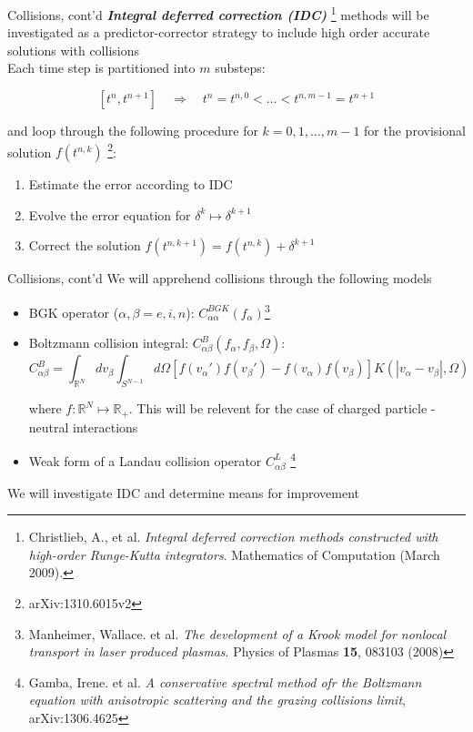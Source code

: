 \documentclass{beamer}
\begin{document}
\begin{frame}{Collisions, cont'd}
\textbf{\emph{Integral deferred correction (IDC)}} \footnote{Christlieb, A., et al. \emph{Integral deferred correction methods constructed with high-order Runge-Kutta integrators}. Mathematics of Computation (March 2009).} methods will be investigated as a predictor-corrector strategy to include high order accurate solutions with collisions\\[0.5em]

Each time step is partitioned into $m$ substeps:

$$[t^n,t^{n+1}] \quad \Rightarrow \quad t^{n} = t^{n,0} < \ldots < t^{n,m-1}= t^{n+1}$$

and loop through the following procedure for $k = 0, 1, \ldots , m-1$ for the provisional solution $f(t^{n,k})$ \footnote{arXiv:1310.6015v2}:

\begin{enumerate}
    \item Estimate the error according to IDC
    \item Evolve the error equation for $\delta^k \mapsto \delta^{k+1}$ 
    \item Correct the solution $f(t^{n,k+1}) = f(t^{n,k}) + \delta^{k+1}$ 
\end{enumerate}

\end{frame}


\begin{frame}{Collisions, cont'd}
We will apprehend collisions through the following models
\begin{itemize}
    \item BGK operator ($\alpha,\beta = e,i,n$): $C_{\alpha\alpha}^{BGK} (f_{\alpha})$\footnote{Manheimer, Wallace. et al. \emph{The development of a Krook model for nonlocal transport in laser produced plasmas}. Physics of Plasmas \textbf{15}, 083103 (2008)}
    \item Boltzmann collision integral: $C_{\alpha\beta}^B(f_{\alpha},f_{\beta},\Omega )$:
$$C_{\alpha\beta}^B = \int_{\mathbb{R}^N} dv_{\beta}\int_{S^{N-1}}d\Omega [f(v_{\alpha}')f(v_{\beta}') - f(v_{\alpha})f(v_{\beta})]K(|v_{\alpha} - v_{\beta}|, \Omega )$$

where $f : \mathbb{R}^N \mapsto \mathbb{R}_+$. This will be relevent for the case of charged particle - neutral interactions
     \item Weak form of a Landau collision operator $C_{\alpha\beta}^L$ \footnote{Gamba, Irene. et al. \emph{A conservative spectral method ofr the Boltzmann equation with anisotropic scattering and the grazing collisions limit},  arXiv:1306.4625}
\end{itemize}
We will investigate IDC and determine means for improvement

\end{frame}
\end{document}
